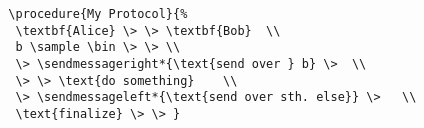 \documentclass[a4paper]{report}
\begin{document}
  
  \begin{center}
  \end{center}
  \begin{lstlisting}
  \procedure{My Protocol}{%
   \textbf{Alice} \> \> \textbf{Bob}  \\
   b \sample \bin \> \> \\
   \> \sendmessageright*{\text{send over } b} \>  \\
   \> \> \text{do something}    \\
   \> \sendmessageleft*{\text{send over sth. else}} \>   \\
   \text{finalize} \> \> }
  \end{lstlisting}
  
\end{document}
